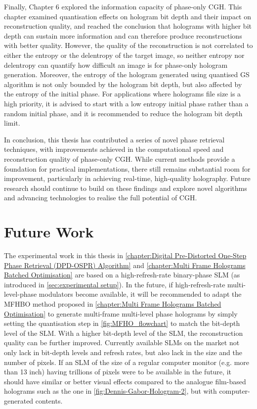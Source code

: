 Finally, Chapter 6 explored the information capacity of phase-only CGH. This chapter examined quantisation effects on hologram bit depth and their impact on reconstruction quality, and reached the conclusion that holograms with higher bit depth can sustain more information and can therefore produce reconstructions with better quality. However, the quality of the reconstruction is not correlated to either the entropy or the delentropy of the target image, so neither entropy nor delentropy can quantify how difficult an image is for phase-only hologram generation. Moreover, the entropy of the hologram generated using quantised GS algorithm is not only bounded by the hologram bit depth, but also affected by the entropy of the initial phase. For applications where holograms file size is a high priority, it is advised to start with a low entropy initial phase rather than a random initial phase, and it is recommended to reduce the hologram bit depth limit.

In conclusion, this thesis has contributed a series of novel phase retrieval techniques, with improvements achieved in the computational speed and reconstruction quality of phase-only CGH. While current methods provide a foundation for practical implementations, there still remains substantial room for improvement, particularly in achieving real-time, high-quality holography. Future research should continue to build on these findings and explore novel algorithms and advancing technologies to realise the full potential of CGH.

\section{Future Work}
The experimental work in this thesis in \cref{chapter:Digital Pre-Distorted One-Step Phase Retrieval (DPD-OSPR) Algorithm} and \cref{chapter:Multi Frame Holograms Batched Optimisation} are based on a high-refresh-rate binary-phase SLM (as introduced in \cref{sec:experimental setup}). In the future, if high-refresh-rate multi-level-phase modulators become available, it will be recommended to adapt the MFHBO method proposed in \cref{chapter:Multi Frame Holograms Batched Optimisation} to generate multi-frame multi-level phase holograms by simply setting the quantisation step in \cref{fig:MFHO_flowchart} to match the bit-depth level of the SLM. With a higher bit-depth level of the SLM, the reconstruction quality can be further improved. Currently available SLMs on the market not only lack in bit-depth levels and refresh rates, but also lack in the size and the number of pixels. If an SLM of the size of a regular computer monitor (e.g. more than 13 inch) having trillions of pixels were to be available in the future, it should have similar or better visual effects compared to the analogue film-based holograms such as the one in \cref{fig:Dennis-Gabor-Hologram-2}, but with computer-generated contents.

